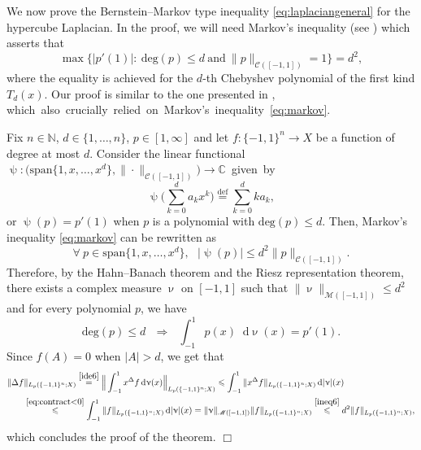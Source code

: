 \documentclass[11pt,reqno]{amsart}
\renewcommand{\leq}{\leqslant}
\newcommand{\1}{\mathbf 1}
\theoremstyle{remark}
\newcommand{\C}{\mathbb C}
\newcommand{\N}{\mathbb N}
\newcommand{\eqdef}{\stackrel{\mathrm{def}}{=}}
\renewcommand{\psi}{\uppsi}
\renewcommand{\nu}{\upnu}
\newcommand*\diff{\mathop{}\!\mathrm{d}}
\newcommand{\ms}{\mathscr}
\begin{document}
\medskip

We now prove the Bernstein--Markov type inequality \eqref{eq:laplaciangeneral} for the hypercube Laplacian. In the proof, we will need Markov's inequality (see \cite[Theorem~5.1.8]{BE95}) which asserts that
\begin{equation} \label{eq:markov}
\max \{ |p'(1)|: \ \mathrm{deg}(p)\leq d \ \mbox{and} \ \|p\|_{\ms{C}([-1,1])}=1\big\} = d^2,
\end{equation}
where the equality is achieved for the $d$-th Chebyshev polynomial of the first kind $T_d(x)$. Our proof is similar to the one presented in \cite{FHKL16}, \mbox{which also crucially relied on Markov's inequality \eqref{eq:markov}.}

\medskip

Fix $n\in\N$, $d\in\{1,\ldots,n\}$, $p\in[1,\infty]$ and let $f:\{-1,1\}^n\to X$ be a function of degree at most $d$. Consider the linear functional \mbox{$\psi:\big(\mathrm{span}\{1,x,\ldots,x^d\}, \|\cdot\|_{\ms{C}([-1,1])}\big) \to\C$ given by}
\begin{equation}
\psi\Big( \sum_{k=0}^d a_k x^k\Big) \eqdef \sum_{k=0}^d ka_k,
\end{equation}
or $\psi(p)=p'(1)$ when $p$ is a polynomial with $\mathrm{deg}(p)\leq d$. Then, Markov's inequality \eqref{eq:markov} can be rewritten as
\begin{equation} \label{ineq6}
\forall \ p\in\mathrm{span}\{1,x,\ldots,x^d\}, \ \ \ |\psi(p)| \leq d^2 \|p\|_{\ms{C}([-1,1])}.
\end{equation}
Therefore, by the Hahn--Banach theorem and the Riesz representation theorem, there exists a complex measure $\nu$ on $[-1,1]$ such that $\|\nu\|_{\ms{M}([-1,1])}\leq d^2$ and for every polynomial $p$, we have
\begin{equation} \label{ide6}
\mathrm{deg}(p)\leq d \ \ \ \Longrightarrow \ \ \ \int_{-1}^1 p(x)\diff\nu(x) = p'(1).
\end{equation}
Since $\widehat{f}(A)=0$ when $|A|>d$, we get that
\begin{equation}
\begin{split}
\|\Delta f&\|_{L_p(\{-1,1\}^n;X)}  \stackrel{\eqref{ide6}}{=} \Big\| \int_{-1}^1 x^\Delta f \diff\nu(x)\Big\|_{L_p(\{-1,1\}^n;X)} \leq \int_{-1}^1 \|x^\Delta f\|_{L_p(\{-1,1\}^n;X)} \diff|\nu|(x) 
\\ & \stackrel{\eqref{eq:contract<0}}{\leq} \int_{-1}^1 \|f\|_{L_p(\{-1,1\}^n;X)} \diff|\nu|(x) = \|\nu\|_{\ms{M}([-1,1])} \|f\|_{L_p(\{-1,1\}^n;X)} \stackrel{\eqref{ineq6}}{\leq} d^2 \|f\|_{L_p(\{-1,1\}^n;X)},
\end{split}
\end{equation}
which concludes the proof of the theorem.
\hfill$\Box$
\end{document}
